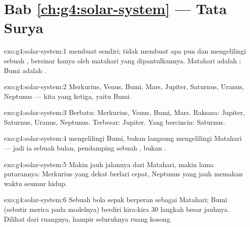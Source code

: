 \section*{Bab \ref{ch:g4:solar-system} --- Tata Surya}

\begin{solution}{exo:g4:solar-system:1}
 membuat  sendiri;  tidak membuat  apa pun
dan mengelilingi sebuah , bersinar hanya oleh  matahari
yang dipantulkannya. Matahari adalah ; Bumi adalah .
\end{solution}

\begin{solution}{exo:g4:solar-system:2}
Merkurius, Venus, Bumi, Mars, Jupiter, Saturnus, Uranus, Neptunus ---
 kita yang ketiga, yaitu Bumi.
\end{solution}

\begin{solution}{exo:g4:solar-system:3}
Berbatu: Merkurius, Venus, Bumi, Mars. Raksasa: Jupiter, Saturnus,
Uranus, Neptunus. Terbesar: Jupiter. Yang bercincin: Saturnus.
\end{solution}

\begin{solution}{exo:g4:solar-system:4}
 mengelilingi Bumi, bukan langsung mengelilingi Matahari ---
jadi ia sebuah bulan, pendamping sebuah , bukan .
\end{solution}

\begin{solution}{exo:g4:solar-system:5}
Makin jauh jalannya dari Matahari, makin lama putarannya: Merkurius
yang dekat berlari cepat, Neptunus yang jauh memakan waktu seumur
hidup.
\end{solution}

\begin{solution}{exo:g4:solar-system:6}
Sebuah bola sepak berperan sebagai Matahari; Bumi (sebutir merica pada
modelnya) berdiri kira-kira $30$ langkah besar jauhnya. Dilihat dari
ruangnya,  hampir seluruhnya ruang kosong.
\end{solution}

